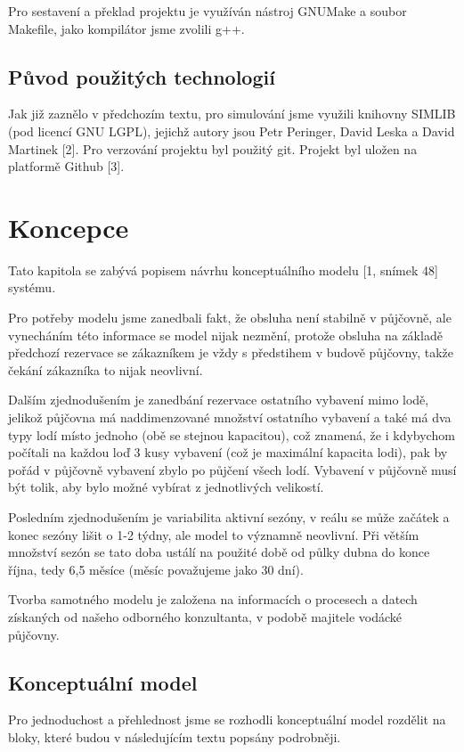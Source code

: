 \documentclass[a4paper, 12pt, hidelinks]{article}
\begin{document}
Pro sestavení a překlad projektu je využíván nástroj GNUMake a soubor Makefile, jako kompilátor jsme zvolili g++.

\subsection{Původ použitých technologií}
Jak již zaznělo v předchozím textu, pro simulování jsme využili knihovny SIMLIB (pod licencí GNU LGPL), jejichž autory jsou Petr Peringer, David Leska a David Martinek [2]. Pro verzování projektu byl použitý git. Projekt byl uložen na platformě Github [3].

\newpage

\section{Koncepce}
Tato kapitola se zabývá popisem návrhu konceptuálního modelu [1, snímek 48] systému.

Pro potřeby modelu jsme zanedbali fakt, že obsluha není stabilně v půjčovně, ale vynecháním této informace se model nijak nezmění, protože obsluha na základě předchozí rezervace se zákazníkem je vždy s předstihem v budově půjčovny, takže čekání zákazníka to nijak neovlivní.

Dalším zjednodušením je zanedbání rezervace ostatního vybavení mimo lodě, jelikož půjčovna má naddimenzované množství ostatního vybavení a také má dva typy lodí místo jednoho (obě se stejnou kapacitou), což znamená, že i kdybychom počítali na každou loď 3 kusy vybavení (což je maximální kapacita lodi), pak by pořád v půjčovně vybavení zbylo po půjčení všech lodí. Vybavení v půjčovně musí být tolik, aby bylo možné vybírat z jednotlivých velikostí.

Posledním zjednodušením je variabilita aktivní sezóny, v reálu se může začátek a konec sezóny lišit o 1-2 týdny, ale model to významně neovlivní. Při větším množství sezón se tato doba ustálí na použité době od půlky dubna do konce října, tedy 6,5 měsíce (měsíc považujeme jako 30 dní).

Tvorba samotného modelu je založena na informacích o procesech a datech získaných od našeho odborného konzultanta, v podobě majitele vodácké půjčovny.

\subsection{Konceptuální model}
Pro jednoduchost a přehlednost jsme se rozhodli konceptuální model rozdělit na bloky, které budou v následujícím textu popsány podrobněji.
\end{document}
